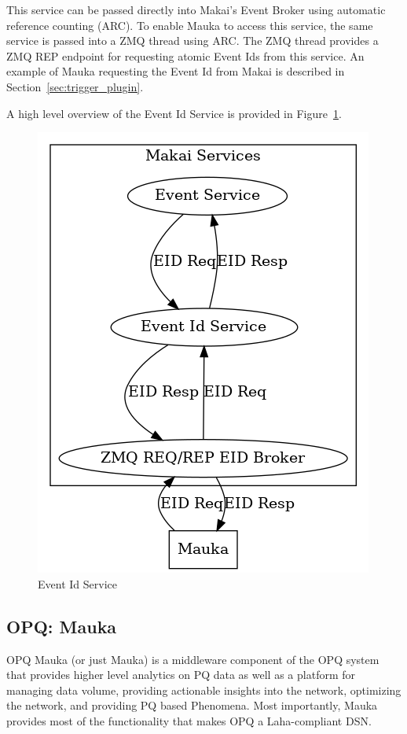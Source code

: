 This service can be passed directly into Makai's Event Broker using automatic reference counting (ARC). To enable Mauka to access this service, the same service is passed into a ZMQ thread using ARC. The ZMQ thread provides a ZMQ REP endpoint for requesting atomic Event Ids from this service. An example of Mauka requesting the Event Id from Makai is described in Section~\ref{sec:trigger_plugin}.

A high level overview of the Event Id Service is provided in Figure~\ref{fig:eid_service}.

\begin{figure}
	\centering
	\includegraphics[width=0.7\linewidth]{figures/event_id_service.png}
	\caption{Event Id Service}
	\label{fig:eid_service}
\end{figure}

\subsection{OPQ: Mauka}\label{subsec:opq:-mauka}
OPQ Mauka (or just Mauka) is a middleware component of the OPQ system that provides higher level analytics on PQ data as well as a platform for managing data volume, providing actionable insights into the network, optimizing the network, and providing PQ based Phenomena. Most importantly, Mauka provides most of the functionality that makes OPQ a Laha-compliant DSN\@.

